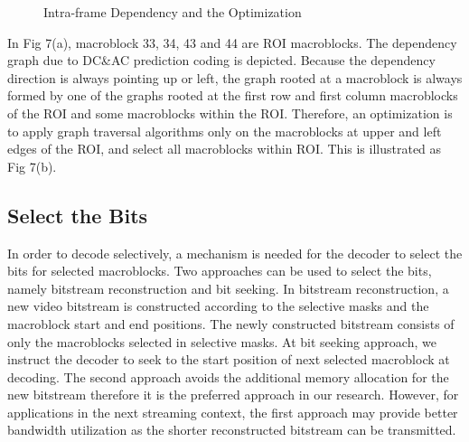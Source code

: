 \begin{figure}
\centering
{}
\quad\quad\quad
{}
\caption[intra.eps]{Intra-frame Dependency and the Optimization}
\end{figure}
In Fig 7(a), macroblock 33, 34, 43 and 44 are ROI macroblocks. The dependency graph due to DC\&AC prediction coding is depicted. Because the dependency direction is always pointing up or left, the graph rooted at a macroblock is always formed by one of the graphs rooted at the first row and first column macroblocks of the ROI and some macroblocks within the ROI. Therefore, an optimization is to apply graph traversal algorithms only on the macroblocks at upper and left edges of the ROI, and select all macroblocks within ROI. This is illustrated as Fig 7(b).

\subsection{Select the Bits}
In order to decode selectively, a mechanism is needed for the decoder to select the bits for selected macroblocks. Two approaches can be used to select the bits, namely bitstream reconstruction and bit seeking. In bitstream reconstruction, a new video bitstream is constructed according to the selective masks and the macroblock start and end positions. The newly constructed bitstream consists of only the macroblocks selected in selective masks. At bit seeking approach, we instruct the decoder to seek to the start position of next selected macroblock at decoding. The second approach avoids the additional memory allocation for the new bitstream therefore it is the preferred approach in our research. However, for applications in the next streaming context, the first approach may provide better bandwidth utilization as the shorter reconstructed bitstream can be transmitted. 

  

